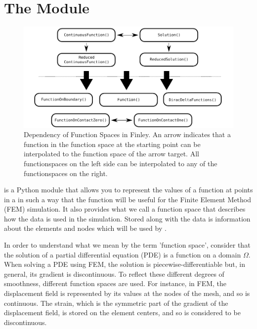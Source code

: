 
%
%
%


\chapter{The Module \escript}
\label{ESCRIPT CHAP}


\begin{figure}
\includegraphics[width=\textwidth]{figures/EscriptDiagram1}
\caption{\label{ESCRIPT DEP}Dependency of Function Spaces in Finley. An arrow indicates that a function in the 
function space at the starting point can be interpolated to the function space of the arrow target.
All functionspaces on the left side can be interpolated to any of the functionspaces on the right.}
\end{figure}

\escript is a Python module that allows you to represent the values of
a function at points in a \Domain in such a way that the function will
be useful for the Finite Element Method (FEM) simulation.  It also
provides what we call a function space that describes how the data is
used in the simulation.  Stored along with the data is information
about the elements and nodes which will be used by \finley.

In order to understand what we mean by the term 'function space',
consider that the solution of a partial differential equation
 (PDE) is a function on a domain
$\Omega$.  When solving a PDE using FEM, the solution is
piecewise-differentiable but, in general, its gradient is
discontinuous.  To reflect these different degrees of smoothness,
different function spaces are used.  For instance, in FEM, the
displacement field is represented by its values at the nodes of the
mesh, and so is continuous.  The strain, which is the symmetric
part of the gradient of the displacement field, is stored on the
element centers, and so is considered to be discontinuous.

